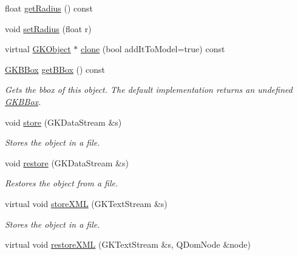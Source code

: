 \begin{DoxyCompactItemize}
\item 
float \hyperlink{classGKCircle_a1ec897531666363e98707aa4379e61f5}{get\+Radius} () const 
\item 
void \hyperlink{classGKCircle_a69bcf4bdfd4cb4ca7dcd6c7b3238d33b}{set\+Radius} (float r)
\item 
virtual \hyperlink{classGKObject}{G\+K\+Object} $\ast$ \hyperlink{classGKCircle_a2b820f2a2970c26fc00d551a928666c5}{clone} (bool add\+It\+To\+Model=true) const 
\item 
\hyperlink{classGKBBox}{G\+K\+B\+Box} \hyperlink{classGKCircle_a226d8bd48d2a1103abc07503eb890675}{get\+B\+Box} () const \hypertarget{classGKCircle_a226d8bd48d2a1103abc07503eb890675}{}\label{classGKCircle_a226d8bd48d2a1103abc07503eb890675}

\begin{DoxyCompactList}\small\item\em Gets the bbox of this object. The default implementation returns an undefined \hyperlink{classGKBBox}{G\+K\+B\+Box}. \end{DoxyCompactList}\item 
void \hyperlink{classGKCircle_aec9a628a5bad05a693e9786cf92a5284}{store} (G\+K\+Data\+Stream \&s)\hypertarget{classGKCircle_aec9a628a5bad05a693e9786cf92a5284}{}\label{classGKCircle_aec9a628a5bad05a693e9786cf92a5284}

\begin{DoxyCompactList}\small\item\em Stores the object in a file. \end{DoxyCompactList}\item 
void \hyperlink{classGKCircle_a7ddc3f516e412e5d002886f087bcdfa4}{restore} (G\+K\+Data\+Stream \&s)\hypertarget{classGKCircle_a7ddc3f516e412e5d002886f087bcdfa4}{}\label{classGKCircle_a7ddc3f516e412e5d002886f087bcdfa4}

\begin{DoxyCompactList}\small\item\em Restores the object from a file. \end{DoxyCompactList}\item 
virtual void \hyperlink{classGKCircle_a929dd6179836a5deb5f03a8720dd61b5}{store\+X\+ML} (G\+K\+Text\+Stream \&s)\hypertarget{classGKCircle_a929dd6179836a5deb5f03a8720dd61b5}{}\label{classGKCircle_a929dd6179836a5deb5f03a8720dd61b5}

\begin{DoxyCompactList}\small\item\em Stores the object in a file. \end{DoxyCompactList}\item 
virtual void \hyperlink{classGKCircle_ac8fc079796a0a89408ec77d9a7f74cc8}{restore\+X\+ML} (G\+K\+Text\+Stream \&s, Q\+Dom\+Node \&node)\hypertarget{classGKCircle_ac8fc079796a0a89408ec77d9a7f74cc8}{}\label{classGKCircle_ac8fc079796a0a89408ec77d9a7f74cc8}


\end{DoxyCompactItemize}
